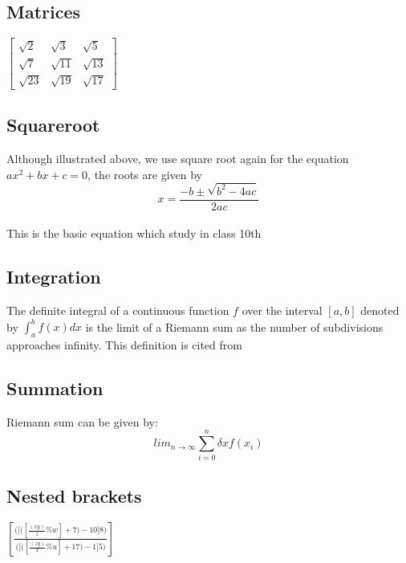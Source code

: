 \documentclass{article}
\begin{document}
\subsection{Matrices}
$\begin{bmatrix}
\sqrt{2}  & \sqrt{3}  &  \sqrt{5}\\
\sqrt{7}  & \sqrt{11} &  \sqrt{13}\\
\sqrt{23} & \sqrt{19} &  \sqrt{17}
\end{bmatrix}$

\subsection{Squareroot}
Although illustrated above, we use square root again for the equation $ ax^2+bx+c=0$, the roots are given by
	$$x = \frac{-b \pm \sqrt{b^2-4ac}}{2ac}$$ \\%
This is the basic equation which study in class 10th \cite{education2016mathematics} %

\newpage

\subsection{Integration}
The definite integral of a continuous function $f$ over the interval $[a,b]$ denoted by $\int_{a}^{b} f(x)dx$ is the limit of a Riemann sum as the number of subdivisions approaches infinity. This definition is cited from \cite{ghorpade2018course} %

\subsection{Summation}
Riemann sum can be given by:%
		$$
		lim_{n\rightarrow \infty}\sum_{i=0}^{n}\delta x f(x_i) 
		$$

\subsection{Nested brackets}%
$ \left[\frac{\Bigg(\bigg[\Big(\left[\frac{\left(xy\right)}{z}\%w\right]+7\Big)-10\bigg]8\Bigg)}{\Bigg(\bigg[\Big(\left[\frac{\left(zy\right)}{x}\%u\right]+17\Big)-1\bigg]5\Bigg)}\right] $
\newpage
\end{document}
